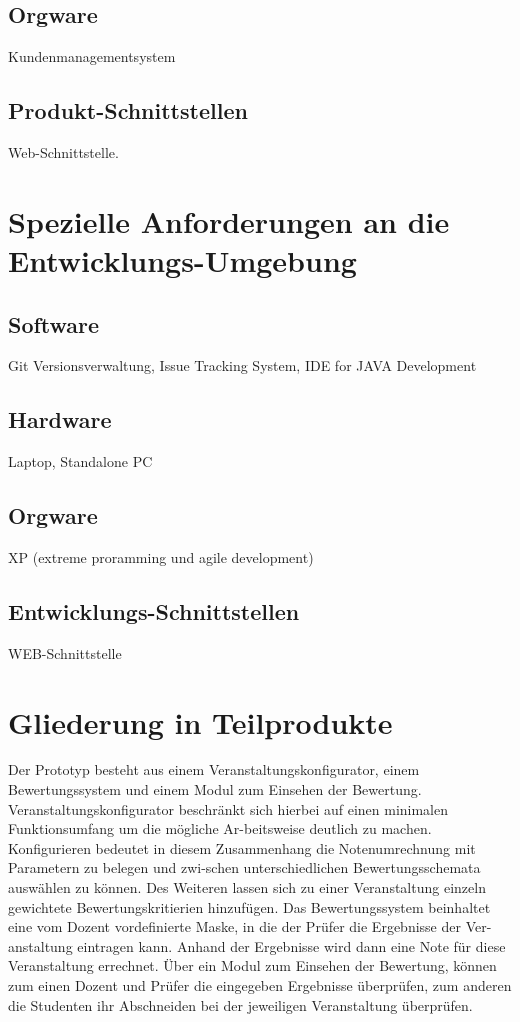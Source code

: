 		\subsection{Orgware}
		Kundenmanagementsystem
		\subsection{Produkt-Schnittstellen}
		Web-Schnittstelle.
	\section{Spezielle Anforderungen an die Entwicklungs-Umgebung}
		\subsection{Software}
		Git Versionsverwaltung, Issue Tracking System, IDE for JAVA Development
		\subsection{Hardware}
		Laptop, Standalone PC
		\subsection{Orgware}
		XP (extreme proramming und agile development)	
		\subsection{Entwicklungs-Schnittstellen}
		WEB-Schnittstelle
	\section{Gliederung in Teilprodukte}
	Der Prototyp besteht aus einem  Veranstaltungskonfigurator, einem Bewertungssystem und einem Modul zum Einsehen der Bewertung.
	Veranstaltungskonfigurator beschränkt sich hierbei auf einen minimalen Funktionsumfang um die mögliche Ar-beitsweise deutlich zu machen. 
	Konfigurieren bedeutet in diesem Zusammenhang die Notenumrechnung mit Parametern zu belegen und zwi-schen unterschiedlichen Bewertungsschemata auswählen zu können. 
	Des Weiteren lassen sich zu einer Veranstaltung einzeln gewichtete Bewertungskritierien hinzufügen. 
	Das Bewertungssystem beinhaltet eine vom Dozent vordefinierte Maske, in die der Prüfer die Ergebnisse der Ver-anstaltung eintragen kann. Anhand der Ergebnisse wird dann eine Note für diese Veranstaltung errechnet.
	Über ein Modul zum Einsehen der Bewertung, können zum einen Dozent und Prüfer die eingegeben Ergebnisse überprüfen, zum anderen die Studenten ihr Abschneiden bei der jeweiligen Veranstaltung überprüfen.
		
